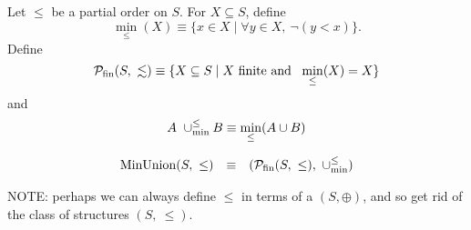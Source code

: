 Let $\leq$ be a partial order on $S$. 
For $X \subseteq S$, define 
\[
\min_\leq(X) \equiv \{x \in X \mid \forall y \in X,\  \neg(y < x)\}. 
\] 
Define 
\[
{\cal P}_{\mathrm{fin}}(S,\ \lesssim) 
   \equiv 
\{X \subseteq S\mid \mbox{$X$ finite and \ }\min_\leq(X) = X\} 
\] 
and 
\[
  A\ \mathbin{\cup_{\min}^{\leq}} B  \equiv  \min_\leq(A\cup B) 
\] 

\[ 
\begin{array}{rcl} 
\mathrm{MinUnion}(S,\ \leq)
   & \equiv 
   & ({\cal P}_{\mathrm{fin}}(S,\ \leq),\ \mathbin{\cup_{\min}^{\leq}})
\end{array} 
\] 


NOTE: perhaps we can always define $\leq$ in terms of a $(S,\oplus)$, and so 
get rid of the class of structures $(S,\ \leq)$. 
